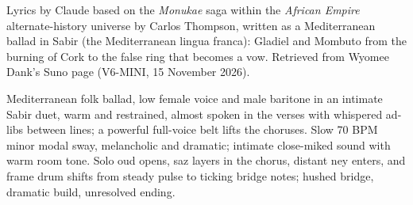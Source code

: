 
\begin{notes}
Lyrics by Claude based on the \emph{Monukae} saga within the \emph{African Empire} alternate-history universe by Carlos Thompson, written as a Mediterranean ballad in Sabir (the Mediterranean lingua franca): Gladiel and Mombuto from the burning of Cork to the false ring that becomes a vow. Retrieved from Wyomee Dank's Suno page (V6-MINI, 15 November 2026).
\end{notes}
\begin{style}
Mediterranean folk ballad, low female voice and male baritone in an intimate Sabir duet, warm and restrained, almost spoken in the verses with whispered ad-libs between lines; a powerful full-voice belt lifts the choruses. Slow 70 BPM minor modal sway, melancholic and dramatic; intimate close-miked sound with warm room tone. Solo oud opens, saz layers in the chorus, distant ney enters, and frame drum shifts from steady pulse to ticking bridge notes; hushed bridge, dramatic build, unresolved ending.
\end{style}
